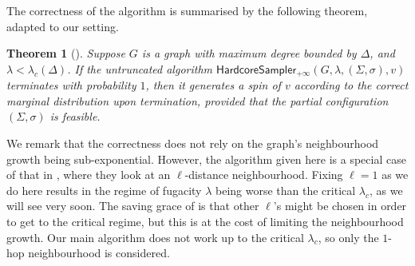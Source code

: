 \documentclass[11pt]{amsart}
\renewcommand{\Pr}{\mathop{\mathrm{Pr}}\nolimits}
\newtheorem{theorem}{Theorem}
\newtheorem{corollary}[theorem]{Corollary}
\theoremstyle{definition}
\theoremstyle{remark}
\newcommand{\hcsampler}{\mathsf{HardcoreSampler}}
\newcommand{\dTV}{d_{\mathrm{TV}}}
\begin{document}
The correctness of the algorithm is summarised by the following theorem, adapted to our setting. 
\begin{theorem}[{\cite[Theorem 5.3]{AJ22}}]
Suppose $G$ is a graph with maximum degree bounded by $\Delta$, and $\lambda<\lambda_c(\Delta)$. 
If the untruncated algorithm $\hcsampler{}_{+\infty}(G,\lambda,(\Sigma,\sigma),v)$ terminates with probability $1$, then it generates a spin of $v$ according to the correct marginal distribution upon termination, provided that the partial configuration $(\Sigma,\sigma)$ is feasible. 
\end{theorem}

We remark that the correctness does not rely on the graph's neighbourhood growth being sub-exponential. 
However, the algorithm given here is a special case of that in \cite{AJ22}, where they look at an $\ell$-distance neighbourhood. 
Fixing $\ell=1$ as we do here results in the regime of fugacity $\lambda$ being worse than the critical $\lambda_c$, as we will see very soon. 
The saving grace of \cite{AJ22} is that other $\ell$'s might be chosen in order to get to the critical regime, but this is at the cost of limiting the neighbourhood growth. 
Our main algorithm does not work up to the critical $\lambda_c$, so only the $1$-hop neighbourhood is considered. 


\end{document}
